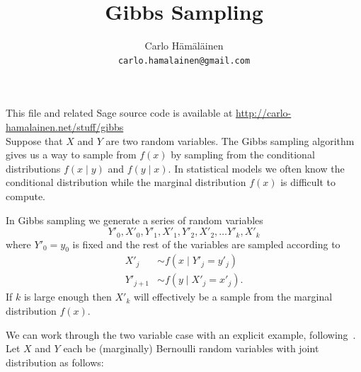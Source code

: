 \documentclass[12pt,amstags,fleqn]{article}
\title{Gibbs Sampling}
\author{Carlo H\"{a}m\"{a}l\"{a}inen\\
{\texttt{carlo.hamalainen@gmail.com}}}
\theoremstyle{plain}
\theoremstyle{definition}
\theoremstyle{definition}
\begin{document}
\maketitle

This file and related Sage source code is available at
\url{http://carlo-hamalainen.net/stuff/gibbs} \\

Suppose that $X$ and $Y$ are two random variables. The Gibbs sampling
algorithm gives us a way to sample from $f(x)$ by sampling from the
conditional distributions $f(x \mid y)$ and $f(y \mid x)$. In
statistical models we often know the conditional distribution while the
marginal distribution $f(x)$ is difficult to compute.

In Gibbs sampling we generate a series of random variables
\[
Y'_0, X'_0,
Y'_1, X'_1,
Y'_2, X'_2,
\dots
Y'_k, X'_k
\]
where $Y'_0 = y_0$ is fixed and the rest of the variables are sampled
according to
\begin{align*}
X'_j &\sim f(x \mid Y'_j = y'_j) \\
Y'_{j+1} &\sim f(y \mid X'_j = x'_j).
\end{align*}
If $k$ is large enough then $X'_k$ will effectively be a sample from the
marginal distribution $f(x)$.

We can work through the two variable case with an explicit example,
following~\cite{gibbs}. Let $X$ and $Y$ each be (marginally) Bernoulli
random variables with joint distribution as follows:
\end{document}
